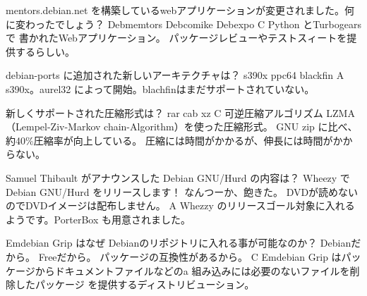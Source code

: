 %

\santaku
{mentors.debian.net を構築しているwebアプリケーションが変更されました。何に変わったでしょう？}
{Debmemtors}
{Debcomike}
{Debexpo}
{C}
{Python とTurbogears で
書かれたWebアプリケーション。
パッケージレビューやテストスィートを提供するらしい。}

\santaku
{debian-ports に追加された新しいアーキテクチャは？}
{s390x}
{ppc64}
{blackfin}
{A}
{s390x。aurel32 によって開始。blachfinはまだサポートされていない。}

\santaku
{新しくサポートされた圧縮形式は？}
{rar}
{cab}
{xz}
{C}
{可逆圧縮アルゴリズム LZMA
（Lempel-Ziv-Markov chain-Algorithm）を使った圧縮形式。
GNU zip に比べ、
約40\%圧縮率が向上している。
圧縮には時間がかかるが、伸長には時間がかからない。
}

\santaku
{Samuel Thibault がアナウンスした Debian GNU/Hurd の内容は？}
{Wheezy で Debian GNU/Hurd をリリースします！}
{なんつーか、飽きた。}
{DVDが読めないのでDVDイメージは配布しません。}
{A}
{Whezzy のリリースゴール対象に入れるようです。PorterBox も用意されました。}

\santaku
{Emdebian Grip はなぜ Debianのリポジトリに入れる事が可能なのか？}
{Debianだから。}
{Freeだから。}
{パッケージの互換性があるから。}
{C}
{Emdebian Grip はパッケージからドキュメントファイルなどのa 
組み込みには必要のないファイルを削除したパッケージ
を提供するディストリビューション。}
